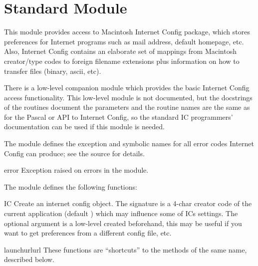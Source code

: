 \section{Standard Module }
\label{module-ic}


This module provides access to Macintosh Internet Config package,
which stores preferences for Internet programs such as mail address,
default homepage, etc. Also, Internet Config contains an elaborate set
of mappings from Macintosh creator/type codes to foreign filename
extensions plus information on how to transfer files (binary, ascii,
etc).

There is a low-level companion module
 which provides the basic
Internet Config access functionality.  This low-level module is not
documented, but the docstrings of the routines document the parameters
and the routine names are the same as for the Pascal or \C{} API to
Internet Config, so the standard IC programmers' documentation can be
used if this module is needed.

The  module defines the  exception and
symbolic names for all error codes Internet Config can produce; see
the source for details.

\begin{excdesc}{error}
Exception raised on errors in the  module.
\end{excdesc}


The  module defines the following functions:

\begin{funcdesc}{IC}{}
Create an internet config object. The signature is a 4-char creator
code of the current application (default ) which may
influence some of ICs settings. The optional  argument is a
low-level  created beforehand, this may be
useful if you want to get preferences from a different config file,
etc.
\end{funcdesc}

\begin{funcdesc}{launchurl}{url}
These functions are ``shortcuts'' to the methods of the same name,
described below.
\end{funcdesc}


